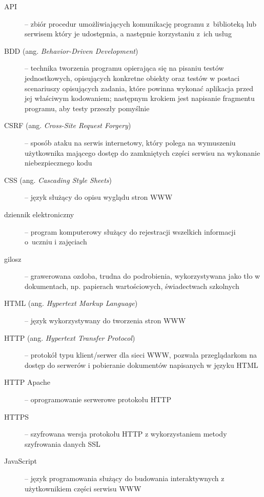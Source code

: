 \documentclass[12pt,leqno,twoside]{mwart}
\begin{document}
\begin{description}
\item[API]-- zbiór procedur umożliwiających komunikację programu z~biblioteką lub serwisem który je udostępnia, a następnie korzystaniu z~ich usług\\
\item[BDD (ang. \textit{Behavior-Driven Development})]-- technika tworzenia programu opierająca się na pisaniu testów jednostkowych, opisujących konkretne obiekty oraz testów w postaci scenariuszy opisujących zadania, które powinna wykonać aplikacja przed jej właściwym kodowaniem; następnym krokiem jest napisanie fragmentu programu, aby testy przeszły pomyślnie\\
\item[CSRF (ang. \textit{Cross-Site Request Forgery})]-- sposób ataku na serwis internetowy, który polega na wymuszeniu użytkownika mającego dostęp do zamkniętych części serwisu na wykonanie niebezpiecznego kodu\\
\item[CSS (ang. \textit{Cascading Style Sheets})]-- język służący do opisu wyglądu stron WWW\\
\item[dziennik elektroniczny]-- program komputerowy służący do rejestracji wszelkich informacji o~uczniu i zajęciach\\
\item[gilosz]-- grawerowana ozdoba, trudna do podrobienia, wykorzystywana jako tło w dokumentach, np. papierach wartościowych, świadectwach szkolnych\\
\item[HTML (ang. \textit{Hypertext Markup Language})]-- język wykorzystywany do tworzenia stron WWW\\
\item[HTTP (ang. \textit{Hypertext Transfer Protocol})]-- protokół typu klient/serwer dla sieci WWW, pozwala przeglądarkom na dostęp do serwerów i pobieranie dokumentów napisanych w języku HTML\\
\item[HTTP Apache]-- oprogramowanie serwerowe protokołu HTTP\\
\item[HTTPS]-- szyfrowana wersja protokołu HTTP z wykorzystaniem metody szyfrowania danych SSL\\
\item[JavaScript]-- język programowania służący do budowania interaktywnych z użytkownikiem części serwisu WWW\\

\end{description}
\end{document}
